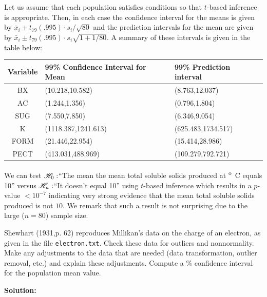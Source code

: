 \documentclass{homework}
\begin{document}
\begin{solution}
  Let us assume that each population satisfies conditions so that $t$-based inference is appropriate.  Then, in each case the confidence interval for the means is given by $\bar x_i \pm t_{79}(.995) \cdot s_i/ \sqrt{80}$ and the prediction intervals for the mean are given by $\bar x_i \pm t_{79}(.995) \cdot s_i \sqrt{ 1 + 1/80}$.  A summary of these intervals is given in the table below:
  \begin{center}
  \renewcommand{\arraystretch}{1.4}
  \begin{tabular}{c| l l}
  \hline
  Variable & 99\% Confidence Interval for Mean & 99\% Prediction interval\\ \hline
  BX & (10.218,10.582) & (8.763,12.037) \\
  AC & (1.244,1.356) & (0.796,1.804) \\
  SUG & (7.550,7.850) & (6.346,9.054) \\
  K & (1118.387,1241.613) & (625.483,1734.517) \\
  FORM & (21.446,22.954) & (15.414,28.986) \\
  PECT & (413.031,488.969) & (109.279,792.721) \\\hline
  \end{tabular}
  \end{center}

  We can test $\mathscr H_0:$``The mean the mean total soluble solids produced at \unit[20]{\textsuperscript oC} equals 10'' versus $\mathscr H_a:$``It doesn't equal 10'' using $t$-based inference which results in a $p$-value $< 10^{-7}$ indicating very strong evidence that the mean total soluble solids produced is not $10$.  We remark that such a result is not surprising due to the large ($n=80$) sample size.
\end{solution}

\begin{longproblem}
  Shewhart (1931,p. 62) reproduces Millikan's data on the charge of an electron, as given in the file \texttt{electron.txt}.  Check these data for outliers and nonnormality.  Make any adjustments to the data that are needed (data transformation, outlier removal, etc.) and explain these adjustments.  Compute a \unit[99]{\%} confidence interval for the population mean value.
\end{longproblem}

{\bf Solution:}
\end{document}
